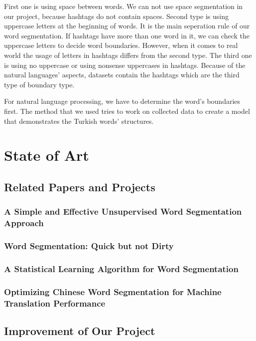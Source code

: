 \documentclass[12pt]{comjnl}
\begin{document}
First one is using space between words. We can not use space segmentation in our project, because hashtags do not contain spaces. 
Second type is using uppercase letters at the beginning of words. It is the main seperation rule of our word segmentation. If hashtags have more than one word in it, we can check the uppercase letters to decide word boundaries. However, when it comes to real world the usage of letters in hashtags differs from the second type.
The third one is using no uppercase or using nonsense uppercases in hashtags. Because of the natural languages' aspects, datasets contain the hashtags which are the third type of boundary type.

For natural language processing, we have to determine the word's boundaries first. The method that we used tries to work on collected data to create a model that demonstrates the Turkish words' structures.

\section{State of Art}
\subsection{Related Papers and Projects}
\subsubsection{A Simple and Effective Unsupervised Word Segmentation Approach}
\subsubsection{Word Segmentation: Quick but not Dirty}
\subsubsection{A Statistical Learning Algorithm for Word Segmentation}
\subsubsection{Optimizing Chinese Word Segmentation for Machine Translation Performance}


\subsection{Improvement of Our Project}
\end{document}
